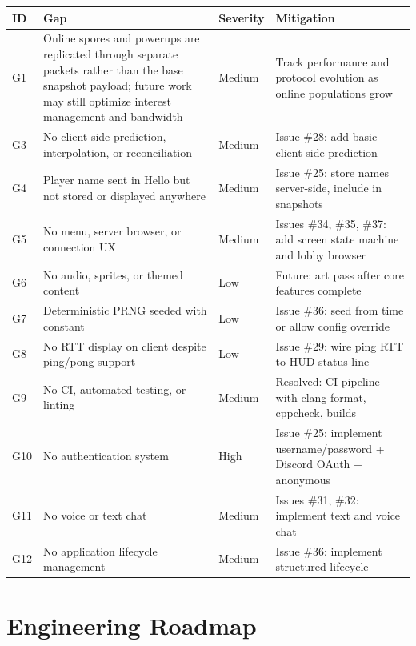 \documentclass[11pt]{article}
\begin{document}
\begin{longtable}{|>{\raggedright\arraybackslash}p{}|>{\raggedright\arraybackslash}p{}|>{\raggedright\arraybackslash}p{}|>{\raggedright\arraybackslash}p{}|}
\hline
\textbf{ID} & \textbf{Gap} & \textbf{Severity} & \textbf{Mitigation} \\
\hline
G1 & Online spores and powerups are replicated through separate packets rather than the base snapshot payload; future work may still optimize interest management and bandwidth & Medium & Track performance and protocol evolution as online populations grow \\
\hline
G3 & No client-side prediction, interpolation, or reconciliation & Medium & Issue \#28: add basic client-side prediction \\
\hline
G4 & Player name sent in Hello but not stored or displayed anywhere & Medium & Issue \#25: store names server-side, include in snapshots \\
\hline
G5 & No menu, server browser, or connection UX & Medium & Issues \#34, \#35, \#37: add screen state machine and lobby browser \\
\hline
G6 & No audio, sprites, or themed content & Low & Future: art pass after core features complete \\
\hline
G7 & Deterministic PRNG seeded with constant & Low & Issue \#36: seed from time or allow config override \\
\hline
G8 & No RTT display on client despite ping/pong support & Low & Issue \#29: wire ping RTT to HUD status line \\
\hline
G9 & No CI, automated testing, or linting & Medium & Resolved: CI pipeline with clang-format, cppcheck, builds \\
\hline
G10 & No authentication system & High & Issue \#25: implement username/password + Discord OAuth + anonymous \\
\hline
G11 & No voice or text chat & Medium & Issues \#31, \#32: implement text and voice chat \\
\hline
G12 & No application lifecycle management & Medium & Issue \#36: implement structured lifecycle \\
\hline
\end{longtable}

\section{Engineering Roadmap}
\label{sec:roadmap}
\end{document}
